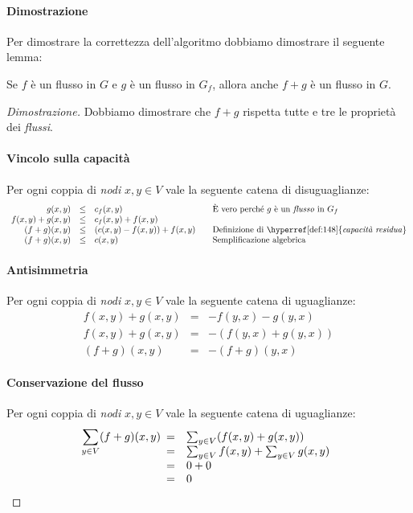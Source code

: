 \paragraph{Dimostrazione}
Per dimostrare la correttezza dell'algoritmo dobbiamo dimostrare il seguente
lemma:

\begin{definition}
    Se $f$ è un flusso in $G$ e $g$ è un flusso in $G_f$, allora anche $f+g$ è
    un flusso in $G$.
\end{definition}
\begin{proof}[Dimostrazione]
    Dobbiamo dimostrare che $f+g$ rispetta tutte e tre le proprietà dei
    \emph{flussi}.

    \paragraph{Vincolo sulla capacità}
    Per ogni coppia di \emph{nodi} $x,y\in V$ vale la seguente catena di
    disuguaglianze:
    \[\begin{array}{rcll}
        g(x,y) & \leq & c_f(x,y) & \quad\text{È vero perché $g$ è un
            \emph{flusso} in $G_f$}\\
        f(x,y)+g(x,y) & \leq & c_f(x,y)+f(x,y)\\
        (f+g)(x,y) &  \leq & (c(x,y)-f(x,y))+f(x,y) & \quad\text{Definizione di
            \hyperref[def:148]{\emph{capacità residua}}}\\
        (f+g)(x,y) & \leq & c(x,y) & \quad\text{Semplificazione algebrica}
    \end{array}\]

    \paragraph{Antisimmetria}
    Per ogni coppia di \emph{nodi} $x,y\in V$ vale la seguente catena di
    uguaglianze:
    \[\begin{array}{rcll}
        f(x,y)+g(x,y) & = & -f(y,x)-g(y,x)\\
        f(x,y)+g(x,y) & = & -(f(y,x)+g(y,x))\\
        (f+g)(x,y) & = & -(f+g)(y,x)
    \end{array}\]

    \paragraph{Conservazione del flusso}
    Per ogni coppia di \emph{nodi} $x,y\in V$ vale la seguente catena di
    uguaglianze:
    \[\sum_{y\in V}(f+g)(x,y)\begin{array}[t]{cl}
        = & \sum_{y\in V}(f(x,y)+g(x,y))\\
        = & \sum_{y\in V}f(x,y)+\sum_{y\in V}g(x,y)\\
        = & 0 + 0\\
        = & 0
    \end{array}\]
\end{proof}

